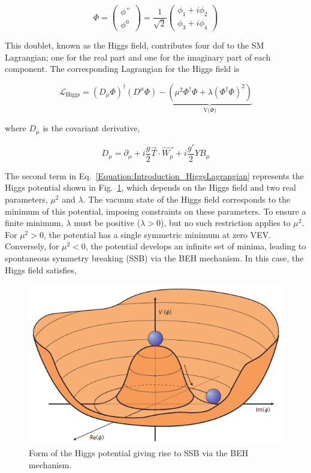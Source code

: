 \begin{equation}
\Phi =
\begin{pmatrix}
\phi^{+} \\
\phi^{0} 
\end{pmatrix}
= \frac{1}{\sqrt{2}} \begin{pmatrix}
    \phi_{1} + i\phi_{2} \\
    \phi_{3} + i\phi_{4}
\end{pmatrix}
\end{equation}

This doublet, known as the Higgs field, contributes four \ac{dof} to the SM Lagrangian; one for the real part and one for the imaginary part of each component. The corresponding Lagrangian for the Higgs field is

\begin{equation}
    \mathcal{L}_{\text{Higgs}} = (D_{\mu} \Phi)^{\dagger}(D^{\mu}\Phi) - \underbrace{(\mu^{2}\Phi^{\dagger}\Phi + \lambda(\Phi^{\dagger}\Phi)^2)}_{\text{V($\Phi$)}}
\label{Equation:Introduction_HiggsLagrangian}
\end{equation}

where $D_{\mu}$ is the covariant derivative,

\begin{equation}
    D_{\mu} = \partial_{\mu} + i\frac{g}{2}\vec{T}\cdot\vec{W_{\mu}} + i\frac{g'}{2}YB_{\mu}
\end{equation}

The second term in Eq.~\ref{Equation:Introduction_HiggsLagrangian} represents the Higgs potential shown in Fig.~\ref{Figure:Introduction_HiggsPotential}, which depends on the Higgs field and two real parameters, $\mu^{2}$ and $\lambda$. The vacuum state of the Higgs field corresponds to the minimum of this potential, imposing constraints on these parameters. To ensure a finite minimum, $\lambda$ must be positive ($\lambda > 0$), but no such restriction applies to $\mu^{2}$. For $\mu^{2} > 0$, the potential has a single symmetric minimum at zero \ac{VEV}. Conversely, for $\mu^{2} < 0$, the potential develops an infinite set of minima, leading to spontaneous symmetry breaking (SSB) via the BEH mechanism. In this case, the Higgs field satisfies,

\begin{figure}[h]
\centering
\includegraphics[width= .7\textwidth]{Figures/Introduction/higgspotential.png}
\caption{Form of the Higgs potential giving rise to SSB via the BEH mechanism.}
\label{Figure:Introduction_HiggsPotential}
\end{figure}

